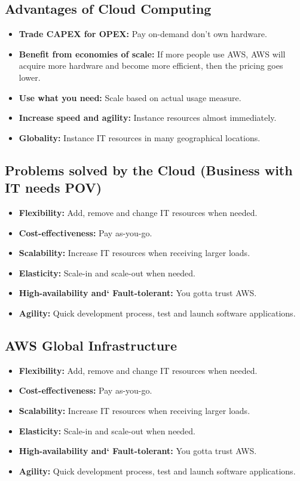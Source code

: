 \subsection{Advantages of Cloud Computing}

\begin{itemize}
	\item \textbf{Trade CAPEX for OPEX:} Pay on-demand don't own hardware.
	\item \textbf{Benefit from economies of scale:} If more people use AWS, AWS will acquire more hardware and become more efficient, then the pricing goes lower.
	\item \textbf{Use what you need:} Scale based on actual usage measure.
	\item \textbf{Increase speed and agility:} Instance resources almost immediately.
	\item \textbf{Globality:} Instance IT resources in many geographical locations.
\end{itemize}

\subsection{Problems solved by the Cloud (Business with IT needs POV)}
\begin{itemize}
	\item \textbf{Flexibility:} Add, remove and change IT resources when needed.
	\item \textbf{Cost-effectiveness:} Pay as-you-go.
	\item \textbf{Scalability:} Increase IT resources when receiving larger loads.
	\item \textbf{Elasticity:} Scale-in and scale-out when needed.
	\item \textbf{High-availability and` Fault-tolerant:} You gotta trust AWS.
	\item \textbf{Agility:} Quick development process, test and launch software applications.
\end{itemize}


\subsection{AWS Global Infrastructure}
\begin{itemize}
	\item \textbf{Flexibility:} Add, remove and change IT resources when needed.
	\item \textbf{Cost-effectiveness:} Pay as-you-go.
	\item \textbf{Scalability:} Increase IT resources when receiving larger loads.
	\item \textbf{Elasticity:} Scale-in and scale-out when needed.
	\item \textbf{High-availability and` Fault-tolerant:} You gotta trust AWS.
	\item \textbf{Agility:} Quick development process, test and launch software applications.
\end{itemize}


